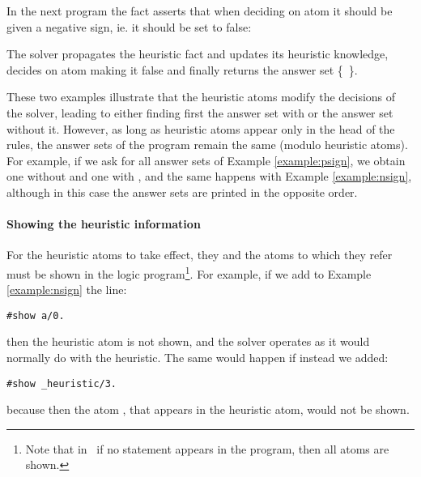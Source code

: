 \begin{example}
\label{example:nsign}
In the next program 
the  fact  asserts that when deciding on atom 
it should be given a negative sign, ie. it should be set to false:

The solver propagates the heuristic fact and updates its heuristic knowledge,
decides on atom  making it false and finally 
returns the answer set \mbox{\{ \}}.
\eexample
\end{example}

These two examples illustrate that the heuristic atoms modify the decisions of the solver,
leading to either finding first the answer set with  or the answer set without it.
However, as long as heuristic atoms appear only in the head of the rules,
the answer sets of the program remain the same (modulo heuristic atoms).
For example, if we ask for all answer sets of Example \ref{example:psign},
we obtain one without  and one with ,
and the same happens with Example \ref{example:nsign}, 
although in this case the answer sets are printed in the opposite order.


\paragraph{Showing the heuristic information}

For the heuristic atoms to take effect, they and the atoms to which they refer 
must be shown in the logic program\footnote{Note that in \gringo\ if no  statement appears in 
the program, then all atoms are shown.}. 
For example, if we add to Example \ref{example:nsign} the line:
\begin{lstlisting}[numbers=none]
#show a/0.
\end{lstlisting}
then the heuristic atom is not shown, 
and the solver operates as it would normally do with the  heuristic. 
The same would happen if instead we added:
\begin{lstlisting}[numbers=none]
#show _heuristic/3.
\end{lstlisting}
because then the atom , that appears in the heuristic atom, would not be shown.

